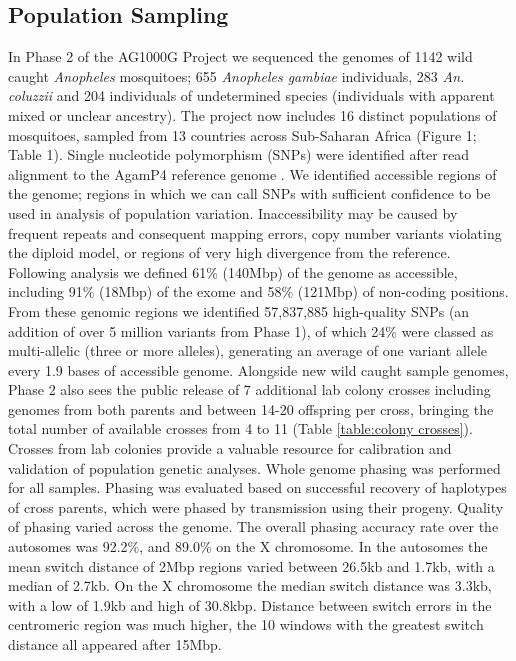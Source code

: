 \documentclass[a4paper,11pt,abstracton,hidelinks]{scrartcl}
\begin{document}
\subsection*{Population Sampling}
%
In Phase 2 of the AG1000G Project we sequenced the genomes of 1142 wild caught \emph{Anopheles} mosquitoes; 655 \textit{Anopheles gambiae} individuals, 283 \textit{An. coluzzii} and 204 individuals of undetermined species (individuals with apparent mixed or unclear ancestry).
%
The project now includes 16 distinct populations of mosquitoes, sampled from 13 countries across Sub-Saharan Africa (Figure 1; Table 1). 
%
Single nucleotide polymorphism (SNPs) were identified after read alignment to the AgamP4 reference genome \cite{Holt2002}.
%
We identified accessible regions of the genome; regions in which we can call SNPs with sufficient confidence to be used in analysis of population variation.
%
Inaccessibility may be caused by frequent repeats and consequent mapping errors, copy number variants violating the diploid model, or regions of very high divergence from the reference.
%
Following analysis we defined 61\% (140Mbp) of the genome as accessible, including 91\% (18Mbp) of the exome and 58\% (121Mbp) of non-coding positions.
%
From these genomic regions we identified 57,837,885 high-quality SNPs (an addition of over 5 million variants from Phase 1\cite{Ag1000gConsortium2017}), of which 24\% were classed as multi-allelic (three or more alleles), generating an average of one variant allele every 1.9 bases of accessible genome.
%
Alongside new wild caught sample genomes, Phase 2 also sees the public release of 7 additional lab colony crosses including genomes from both parents and between 14-20 offspring per cross, bringing the total number of available crosses from 4 to 11 (Table \ref{table:colony crosses}).
%
Crosses from lab colonies provide a valuable resource for calibration and validation of population genetic analyses.
%
Whole genome phasing was performed for all samples. 
%
Phasing was evaluated based on successful recovery of haplotypes of cross parents, which were phased by transmission using their progeny.
Quality of phasing varied across the genome. 
%
The overall phasing accuracy rate over the autosomes was 92.2\%, and 89.0\% on the X chromosome.
%
In the autosomes the mean switch distance of 2Mbp regions varied between 26.5kb and 1.7kb, with a median of 2.7kb.
%
On the X chromosome the median switch distance was 3.3kb, with a low of 1.9kb and high of 30.8kbp.
%
Distance between switch errors in the centromeric region was much higher, the 10 windows with the greatest switch distance all appeared after 15Mbp.
\end{document}
